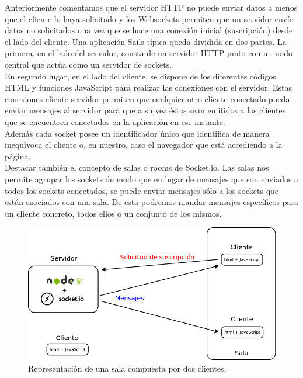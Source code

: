 Anteriormente comentamos que el servidor HTTP no puede enviar datos a menos que el cliente lo haya solicitado y los Websockets permiten que un servidor envíe datos no solicitados una vez que se hace 
una conexión inicial (suscripción) desde el lado del cliente. Una aplicación Sails típica queda dividida en dos partes. La primera, en el lado del servidor, consta de un servidor HTTP junto con un nodo
central que actúa como un servidor de sockets.\\ 

En segundo lugar, en el lado del cliente, se dispone de los diferentes códigos HTML y funciones JavaScript para realizar las conexiones con el servidor. Estas conexiones cliente-servidor permiten que 
cualquier otro cliente conectado pueda enviar mensajes al servidor para que a su vez éstos sean emitidos a los clientes que se encuentren conectados en la aplicación en ese instante.\\

Además cada socket posee un identificador único que identifica de manera inequívoca el cliente o, en nuestro, caso el navegador que está accediendo a la página.\\

Destacar también el concepto de salas o rooms de Socket.io. Las salas nos permite agrupar los sockets de modo que en lugar de mensajes que son enviados a todos los sockets conectados, se puede enviar mensajes
sólo a los sockets que están asociados con una sala. De esta podremos mandar mensajes específicos para un cliente concreto, todos ellos o un conjunto de los mismos. \\


\begin{figure}[H]
  \begin{center}
    \includegraphics[scale=0.35]{diagramas/salas-websocket.png}
  \end{center}
  \caption{Representación de una sala compuesta por dos clientes.}
  \label{view:userindex}
\end{figure}


